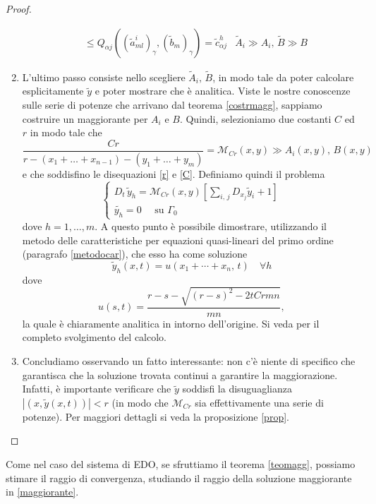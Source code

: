 \begin{proof}
\begin{enumerate}
\begin{align*}
&\leq Q_{\alpha j}\left((\widetilde{a}^i_{ml})_\gamma, (\widetilde{b}_m)_\gamma\right) = \widetilde{c}^h_{\alpha j}
& \widetilde{A}_i \gg A_i, \, \widetilde{B} \gg B
\end{align*}
\item L'ultimo passo consiste nello scegliere $\widetilde{A}_i, \, \widetilde{B}$, in modo tale da poter calcolare esplicitamente $\widetilde{y}$ e poter mostrare che è analitica. Viste le nostre conoscenze sulle serie di potenze che arrivano dal teorema \ref{costrmagg}, sappiamo costruire un maggiorante per $A_i$ e $B$. Quindi, selezioniamo due costanti $C$ ed $r$ in modo tale che 
$$\frac{Cr}{r-(x_1+\ldots +x_{n-1})-(y_1+\ldots +y_m)}=\mathcal{M}_{Cr}(x,y) \gg A_i(x,y),\, B(x,y)$$
e che soddisfino le disequazioni \eqref{r} e \eqref{C}. Definiamo quindi il problema
\begin{equation*}
\begin{cases}
D_t \, \widetilde{y}_h = \mathcal{M}_{Cr} (x,y) \left[\sum\limits_{i,\, j} D_{x_j}\widetilde{y}_i+1 \right] \\
\widetilde{y_h}=0 \quad \text{ su } \Gamma_0
\end{cases}
\end{equation*}
dove $h=1,\ldots, m$. A questo punto è possibile dimostrare, utilizzando il metodo delle caratteristiche per equazioni quasi-lineari del primo ordine (paragrafo \ref{metodocar}), che esso ha come soluzione
\begin{equation}\label{maggiorante}
\widetilde{y}_h(x,t)=u(x_1+\cdots +x_n,\,t) \quad \forall h
\end{equation}
dove
\begin{equation}\label{sol}
u(s,t)=\frac{r-s-\sqrt{(r-s)^2-2tCrmn}}{mn},
\end{equation}
la quale è chiaramente analitica in intorno dell'origine. Si veda \cite[cap.1]{Folland} per il completo svolgimento del calcolo.
\item Concludiamo osservando un fatto interessante: non c'è niente di specifico che garantisca che la soluzione trovata continui a garantire la maggiorazione. Infatti, è importante verificare che $\widetilde{y}$ soddisfi la disuguaglianza $|(x,\widetilde{y}(x,t))|< r$ (in modo che $\mathcal{M}_{Cr}$ sia effettivamente una serie di potenze). Per maggiori dettagli si veda la proposizione \ref{prop}.
\end{enumerate}
\end{proof}

\newpage

Come nel caso del sistema di EDO, se sfruttiamo il teorema \ref{teomagg}, possiamo stimare il raggio di convergenza, studiando il raggio della soluzione maggiorante in \eqref{maggiorante}. 

